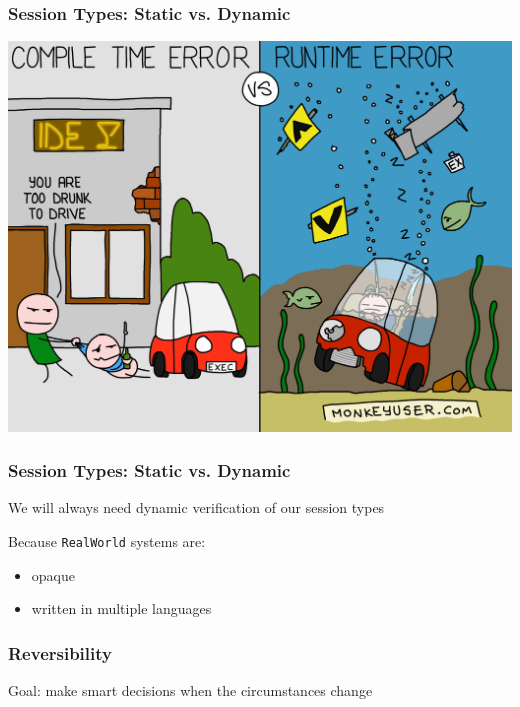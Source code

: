 \documentclass[12pt]{beamer}
\begin{document}
\begin{frame}
\frametitle{Session Types: Static vs. Dynamic}

\begin{center}
\includegraphics[scale=0.120]{img/runtime-vs-compile-time-errors.png}
\end{center}
\end{frame}

\begin{frame}
\frametitle{Session Types: Static vs. Dynamic}
\begin{center}

    \Large{We will always need dynamic verification of our session types}

\end{center}
Because \texttt{RealWorld} systems are: 


\begin{itemize}
    \item opaque
    \item written in multiple languages
\end{itemize}

\end{frame}


\begin{frame}
\frametitle{Reversibility}

\begin{center}
    \Large{Goal: make smart decisions when the circumstances change} 


    
\end{center}

\end{frame}
\end{document}
